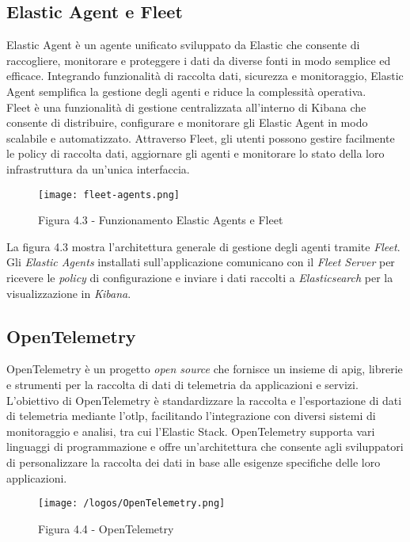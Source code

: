 \subsection*{Elastic Agent e Fleet}
Elastic Agent è un agente unificato sviluppato da Elastic che consente di raccogliere, monitorare e proteggere i dati da diverse fonti in modo semplice ed efficace. Integrando funzionalità di raccolta dati, sicurezza e monitoraggio, Elastic Agent semplifica la gestione degli agenti e riduce la complessità operativa. \\
Fleet è una funzionalità di gestione centralizzata all'interno di Kibana che consente di distribuire, configurare e monitorare gli Elastic Agent in modo scalabile e automatizzato. Attraverso Fleet, gli utenti possono gestire facilmente le policy di raccolta dati, aggiornare gli agenti e monitorare lo stato della loro infrastruttura da un'unica interfaccia.
\begin{figure}[H] 
    \centering 
    \texttt{[image: fleet-agents.png]} 
    \caption{Figura 4.3 - Funzionamento Elastic Agents e Fleet}
\end{figure}
La figura 4.3 mostra l'architettura generale di gestione degli agenti tramite \emph{Fleet}. Gli \emph{Elastic Agents} installati sull'applicazione comunicano con il \emph{Fleet Server} per ricevere le \emph{policy} di configurazione e inviare i dati raccolti a \emph{Elasticsearch} per la visualizzazione in \emph{Kibana}.   
\vspace{1em}

\subsection*{OpenTelemetry}
OpenTelemetry è un progetto \emph{open source} che fornisce un insieme di \gls{apig}, librerie e strumenti per la raccolta di dati di telemetria da applicazioni e servizi. L'obiettivo di OpenTelemetry è standardizzare la raccolta e l'esportazione di dati di telemetria mediante l'\gls{otlp}, facilitando l'integrazione con diversi sistemi di monitoraggio e analisi, tra cui l'Elastic Stack. OpenTelemetry supporta vari linguaggi di programmazione e offre un'architettura che consente agli sviluppatori di personalizzare la raccolta dei dati in base alle esigenze specifiche delle loro applicazioni.
\begin{figure}[H] 
    \centering 
    \texttt{[image: /logos/OpenTelemetry.png]} 
    \caption{Figura 4.4 - OpenTelemetry}
\end{figure}

